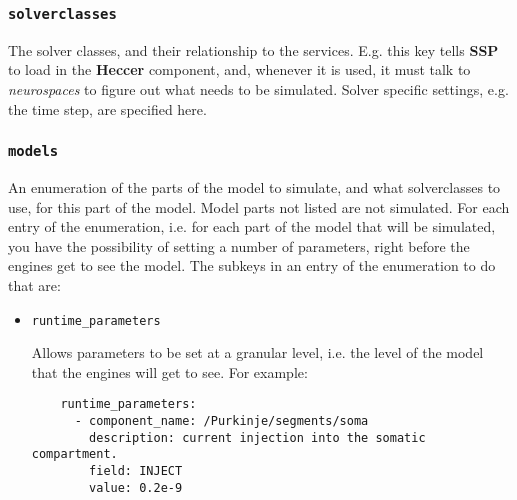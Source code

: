\documentclass[12pt]{article}
\begin{document}
\subsubsection*{\tt solverclasses}

    The solver classes, and their relationship to the services. E.g. this key tells {\bf SSP} to load in the {\bf Heccer} component, and, whenever it is used, it must talk to {\it neurospaces} to figure out what needs to be simulated. Solver specific settings, e.g. the time step, are specified here. 

\subsubsection*{\tt models}

    An enumeration of the parts of the model to simulate, and what solverclasses to use, for this part of the model. Model parts not listed are not simulated. For each entry of the enumeration, i.e. for each part of the model that will be simulated, you have the possibility of setting a number of parameters, right before the engines get to see the model. The subkeys in an entry of the enumeration to do that are: 

\begin{itemize}

\item[ ] {\tt runtime\_parameters}

Allows parameters to be set at a granular level, i.e. the level of the model that the engines will get to see. For example: 

\begin{verbatim}
    runtime_parameters:
      - component_name: /Purkinje/segments/soma
        description: current injection into the somatic compartment.
        field: INJECT
        value: 0.2e-9
\end{verbatim}




\end{itemize}
\end{document}
